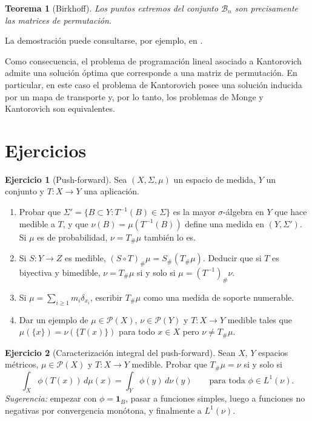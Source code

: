 \documentclass[12pt, a4paper]{amsbook}
\newcommand{\I}{{\mathbf 1}}
\newtheorem{teo}{Teorema}[section]
\theoremstyle{remark}
\theoremstyle{definition}
\newtheorem{ejercicio}{Ejercicio}[chapter]
\numberwithin{section}{chapter}
\numberwithin{subsection}{section}
\numberwithin{equation}{section}
\numberwithin{figure}{chapter}
\begin{document}
\begin{teo}[Birkhoff]
Los puntos extremos del conjunto \(\mathcal B_n\) son precisamente las matrices de permutación.
\end{teo}

La demostración puede consultarse, por ejemplo, en \cite{Villani2003}.

Como consecuencia, el problema de programación lineal asociado a Kantorovich admite una solución óptima que corresponde a una matriz de permutación. En particular, en este caso el problema de Kantorovich posee una solución inducida por un mapa de transporte y, por lo tanto, los problemas de Monge y Kantorovich son equivalentes.


\section*{Ejercicios}

\begin{ejercicio}[Push-forward]\label{ejer.pushforward}
Sea $(X,\Sigma,\mu)$ un espacio de medida, $Y$ un conjunto y $T\colon X\to Y$
una aplicación.
\begin{enumerate}[label=(\alph*)]
\item Probar que $\Sigma'=\{B\subset Y: T^{-1}(B)\in\Sigma\}$ es la mayor
$\sigma$-álgebra en $Y$ que hace medible a $T$, y que
$\nu(B)=\mu(T^{-1}(B))$ define una medida en $(Y,\Sigma')$. Si $\mu$ es de
probabilidad, $\nu=T_\#\mu$ también lo es.
\item Si $S\colon Y\to Z$ es medible, $(S\circ T)_\#\mu=S_\#(T_\#\mu)$.
Deducir que si $T$ es biyectiva y bimedible, $\nu=T_\#\mu$ si y solo si
$\mu=(T^{-1})_\#\nu$.
\item Si $\mu=\sum_{i\ge1}m_i\delta_{x_i}$, escribir $T_\#\mu$ como una medida
de soporte numerable.
\item Dar un ejemplo de $\mu\in\mathcal P(X)$, $\nu\in\mathcal P(Y)$ y
$T\colon X\to Y$ medible tales que $\mu(\{x\})=\nu(\{T(x)\})$ para todo $x\in X$
pero $\nu\ne T_\#\mu$.
\end{enumerate}
\end{ejercicio}

\begin{ejercicio}[Caracterización integral del push-forward]\label{ejer.pushforward.integral}
Sean $X$, $Y$ espacios métricos, $\mu\in\mathcal P(X)$ y $T\colon X\to Y$
medible. Probar que $T_\#\mu=\nu$ si y solo si
\[
\int_X\phi(T(x))\,d\mu(x)=\int_Y\phi(y)\,d\nu(y)
\qquad\text{para toda }\phi\in L^1(\nu).
\]
\emph{Sugerencia:} empezar con $\phi=\I_B$, pasar a funciones simples, luego
a funciones no negativas por convergencia monótona, y finalmente a $L^1(\nu)$.
\end{ejercicio}
\end{document}
